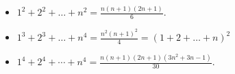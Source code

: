 \begin{itemize}
    \item $\displaystyle 
            1^2 + 2^2 + \dotsc + n^2 = \frac{n(n + 1)(2n + 1)}{6}.$

    \item $\displaystyle 
            1^3 + 2^3 + \dotsc + n^4 = \frac{n^2(n + 1)^2}{4} = (1 + 2 + \dotsc + n)^2$

    \item $\displaystyle 
            1^4 + 2^4 + \cdots + n^4 = \frac{n(n + 1)(2n + 1)(3n^2 + 3n - 1)}{30}.$
\end{itemize}